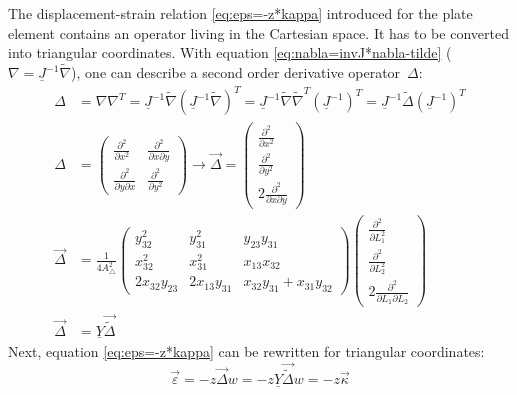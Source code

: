   The displacement-strain relation \eqref{eq:eps=-z*kappa} introduced for the plate element contains an operator living in the Cartesian space. It has to be converted into triangular coordinates. With equation \eqref{eq:nabla=invJ*nabla-tilde} ($\nabla = \underline{J}^{-1}\tilde{\nabla}$), one can describe a second order derivative operator~$\Delta$:
  \begin{align}
  \Delta &= \nabla \nabla^T = \underline{J}^{-1}\tilde{\nabla}\left(\underline{J}^{-1}\tilde{\nabla}\right)^T = \underline{J}^{-1} \tilde{\nabla} \tilde{\nabla}^T \left(\underline{J}^{-1}\right)^T = \underline{J}^{-1} \tilde{\Delta} \left(\underline{J}^{-1}\right)^T\\
  \Delta &= \begin{pmatrix}
  \frac{\partial^2}{\partial x^2} & \frac{\partial^2}{\partial x \partial y}\\
  \frac{\partial^2}{\partial y \partial x} & \frac{\partial^2}{\partial y^2}
  \end{pmatrix} \rightarrow \vec{\Delta} = \begin{pmatrix}
  \frac{\partial^2}{\partial x^2} \\
  \frac{\partial^2}{\partial y^2} \\
  2\frac{\partial^2}{\partial x \partial y}
  \end{pmatrix} \nonumber\\
  \vec{\Delta} &= \frac{1}{4 A_\triangle^2} \begin{pmatrix}
  y_{32}^2 & y_{31}^2 & y_{23} y_{31}\\
  x_{32}^2 & x_{31}^2 & x_{13} x_{32}\\
  2 x_{32} y_{23} & 2 x_{13} y_{31} & x_{32} y_{31} + x_{31} y_{32}
  \end{pmatrix} \begin{pmatrix}
  \frac{\partial^2}{\partial L_1^2} \\
  \frac{\partial^2}{\partial L_2^2} \\
  2\frac{\partial^2}{\partial L_1 \partial L_2}
  \end{pmatrix} \nonumber\\
  \vec{\Delta} &= \underline{Y} \vec{\tilde{\Delta}}
  \end{align}
  Next, equation \eqref{eq:eps=-z*kappa} can be rewritten for triangular coordinates:
  \begin{equation}
  \vec{\varepsilon} = -z \vec{\Delta} w = -z \underline{Y} \vec{\tilde{\Delta}} w = -z \vec{\kappa}
  \end{equation}
